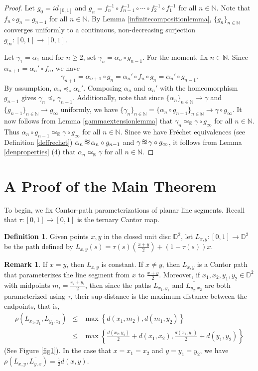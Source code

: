 \documentclass[12pt, leqno]{amsart}
\newcommand{\tripproxs}{\,\setbox0\hbox{$\approx$}%
\mbox{\makebox[0pt][l]{\raisebox{0.48\ht0}{$\approx$}}$\approx$}\,}
\newcommand{\ord}{\preceq_{\ast}}
\newcommand{\ui}{[0,1]}
\newcommand{\den}{\simeq_{\bbr}}
\newcommand{\bbd}{\mathbb{D}}
\newcommand{\bbn}{\mathbb{N}}
\newcommand{\bbr}{\mathbb{R}}
\newcommand{\ov}{\overline}
\theoremstyle{definition}\newtheorem{definition}[theorem]{Definition}
\newtheorem{remark}[theorem]{Remark}
\begin{document}
\begin{proof}
Let $g_0=id_{\ui}$ and $g_n=f_{n}^{-1}\circ f_{n-1}^{-1}\circ \cdots \circ f_{2}^{-1}\circ f_{1}^{-1}$ for all $n\in\bbn$. Note that $f_{n}\circ g_{n}=g_{n-1}$ for all $n\in\bbn$. By Lemma \ref{infinitecompositionlemma}, $\{g_n\}_{n\in\bbn}$ converges uniformly to a continuous, non-decreasing surjection $g_{\infty}:\ui\to\ui$.

Let $\gamma_1=\alpha_1$ and for $n\geq 2$, set $\gamma_n=\alpha_n\circ g_{n-1}$. For the moment, fix $n\in\bbn$. Since $\alpha_{n+1}=\alpha_{n}'\circ f_n$, we have \[\gamma_{n+1}=\alpha_{n+1}\circ g_{n}=\alpha_{n}'\circ f_n\circ g_n=\alpha_{n}'\circ g_{n-1}.\] By assumption, $\alpha_{n}\ord \alpha_{n}'$. Composing $\alpha_{n}$ and $ \alpha_{n}'$ with the homeomorphism $g_{n-1}$ gives $\gamma_{n}\ord\gamma_{n+1}$. Additionally, note that since $\{\alpha_n\}_{n\in\bbn}\to \gamma$ and $\{g_{n-1}\}_{n\in\bbn}\to g_{\infty}$ uniformly, we have $\{\gamma_n\}_{n\in\bbn}=\{\alpha_n\circ g_{n-1}\}_{n\in\bbn}\to \gamma\circ g_{\infty}$. It now follows from Lemma \ref{gammaextensionlemma} that $\gamma_n\den\gamma\circ g_{\infty}$ for all $n\in\bbn$. Thus $\alpha_n\circ g_{n-1}\den \gamma\circ g_{\infty}$ for all $n\in\bbn$. Since we have Fr\'echet equivalences  (see Definition \ref{deffrechet}) $\alpha_n\tripproxs \alpha_n\circ g_{n-1}$ and $\gamma\tripproxs \gamma\circ g_{\infty}$, it follows from Lemma \ref{denproperties} (4) that $\alpha_{n}\den \gamma$ for all $n\in\bbn$.
\end{proof}
%
%
\section{A Proof of the Main Theorem}\label{sec: proof of main theorem}

To begin, we fix Cantor-path parameterizations of planar line segments. Recall that $\tau:\ui\to\ui$ is the ternary Cantor map.
\begin{definition}\label{lxydef}
Given points $x,y$ in the closed unit disc $\bbd^2$, let $L_{x,y}:\ui\to\bbd^2$ be the path defined by $L_{x,y}(s)=\tau(s)(\frac{x+y}{2})+(1-\tau(s))x$.
\end{definition}

\begin{remark}\label{linearpathremark}
If $x=y$, then $L_{x,y}$ is constant. If $x\neq y$, then $L_{x,y}$ is a Cantor path that parameterizes the line segment from $x$ to $\frac{x+y}{2}$. Moreover, if $x_1,x_2,y_1,y_2\in \bbd^2$ with midpoints $m_i=\frac{x_i+y_i}{2}$, then since the paths $L_{x_1,y_1}$ and $\ov{L_{y_2,x_2}}$ are both parameterized using $\tau$, their sup-distance is the maximum distance between the endpoints, that is,
\begin{eqnarray*}
\rho(L_{x_1,y_1},\ov{L_{y_2,x_2}}) &\leq& \max\left\{d(x_1,m_2),d(m_1,y_2)\right\}\\
&\leq & \max\left\{\frac{d(x_2,y_2)}{2}+d(x_1,x_2),\frac{d(x_1,y_1)}{2}+d(y_1,y_2)\right\}
\end{eqnarray*}
(See Figure \ref{fig1}). In the case that $x=x_1=x_2$ and $y=y_1=y_2$, we have $\rho(L_{x,y},\ov{L_{y,x}})=\frac{1}{2}d(x,y)$.
\end{remark}
\end{document}

